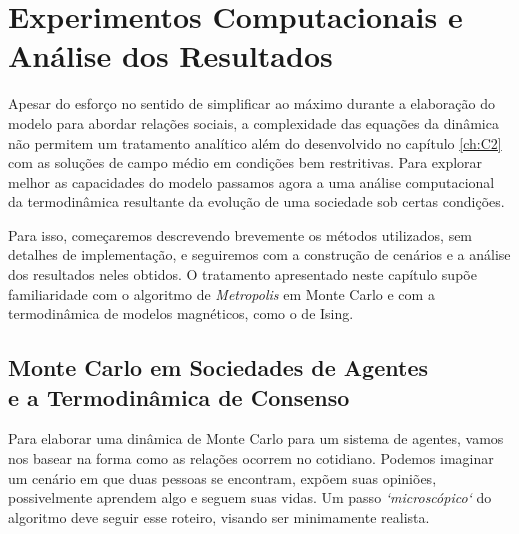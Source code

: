

\chapter{Experimentos Computacionais e Análise dos Resultados}
\label{ch:C3}

Apesar do esforço no sentido de simplificar ao máximo durante a elaboração do modelo para abordar relações sociais, a complexidade das equações da dinâmica não permitem um tratamento analítico além do desenvolvido no capítulo \ref{ch:C2} com as soluções de campo médio em condições bem restritivas.
Para explorar melhor as capacidades do modelo passamos agora a uma análise computacional da termodinâmica resultante da evolução de uma sociedade sob certas condições.

Para isso, começaremos descrevendo brevemente os métodos utilizados, sem detalhes de implementação, e seguiremos com a construção de cenários e a análise dos resultados neles obtidos.
O tratamento apresentado neste capítulo supõe familiaridade com o algoritmo de \emph{Metropolis} em Monte Carlo e com a termodinâmica de modelos magnéticos, como o de Ising.

\section{Monte Carlo em Sociedades de Agentes\\e a Termodinâmica de Consenso}
\label{sec:MCCT}

Para elaborar uma dinâmica de Monte Carlo para um sistema de agentes, vamos nos basear na forma como as relações ocorrem no cotidiano.
Podemos imaginar um cenário em que duas pessoas se encontram, expõem suas opiniões, possivelmente aprendem algo e seguem suas vidas.
Um passo \emph{`microscópico`} do algoritmo deve seguir esse roteiro, visando ser minimamente realista.

